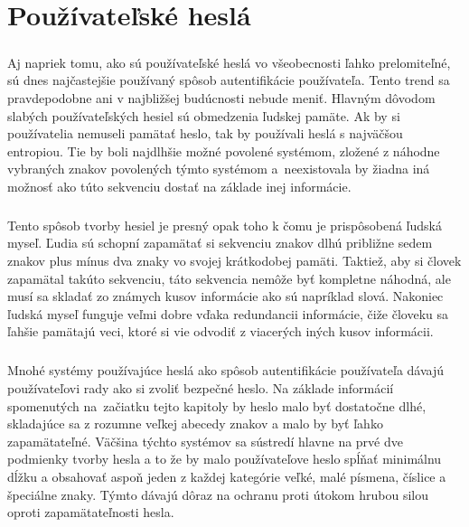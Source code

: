 \chapter{Používateľské heslá}

\paragraph{}
Aj napriek tomu, ako sú používateľské heslá vo všeobecnosti ľahko prelomiteľné, sú dnes najčastejšie používaný spôsob autentifikácie používateľa. Tento trend sa pravdepodobne ani v najbližšej budúcnosti nebude meniť. Hlavným dôvodom slabých používateľských hesiel sú obmedzenia ľudskej pamäte. Ak by si používatelia nemuseli pamätať heslo, tak by používali heslá s najväčšou entropiou. Tie by boli najdlhšie možné povolené systémom, zložené z náhodne vybraných znakov povolených týmto systémom a~neexistovala by žiadna iná možnosť ako túto sekvenciu dostať na základe inej informácie.

\paragraph{}
Tento spôsob tvorby hesiel je presný opak toho k čomu je prispôsobená ľudská myseľ. Ľudia sú schopní zapamätať si sekvenciu znakov dlhú približne sedem znakov plus mínus dva znaky vo svojej krátkodobej pamäti. Taktiež, aby si človek zapamätal takúto sekvenciu, táto sekvencia nemôže byť kompletne náhodná, ale musí sa skladať zo známych kusov informácie ako sú napríklad slová. Nakoniec ľudská myseľ funguje veľmi dobre vďaka redundancii informácie, čiže človeku sa ľahšie pamätajú veci, ktoré si vie odvodiť z viacerých iných kusov informácii.

\paragraph{}
Mnohé systémy používajúce heslá ako spôsob autentifikácie používateľa dávajú používateľovi rady ako si zvoliť bezpečné heslo. Na základe informácií spomenutých na~začiatku tejto kapitoly by heslo malo byť dostatočne dlhé, skladajúce sa z rozumne veľkej abecedy znakov a malo by byť ľahko zapamätateľné. Väčšina týchto systémov sa sústredí hlavne na prvé dve podmienky tvorby hesla a to že by malo používateľove heslo spĺňať minimálnu dĺžku a obsahovať aspoň jeden z každej kategórie veľké, malé písmena, číslice a špeciálne znaky. Týmto dávajú dôraz na ochranu proti útokom hrubou silou oproti zapamätateľnosti hesla.

